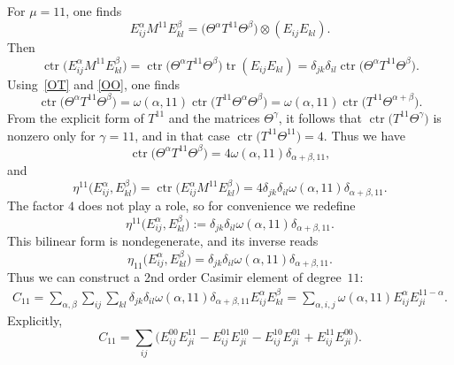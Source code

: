 \documentclass[pdftex]{sigma}
\numberwithin{equation}{section}
\theoremstyle{definition}
\begin{document}
For $\mu=11$, one finds
\begin{equation*}
	E_{ij}^\alpha M^{11} E_{kl}^\beta=
	\bigl(\Theta^\alpha T^{11} \Theta^\beta\bigr) \otimes (E_{ij}E_{kl}).
\end{equation*}
Then
\begin{equation*}
	\operatorname{ctr}\bigl(E_{ij}^\alpha M^{11} E_{kl}^\beta\bigr) = \operatorname{ctr}\bigl(\Theta^\alpha T^{11} \Theta^\beta\bigr) \operatorname{tr}(E_{ij}E_{kl} )
	= \delta_{jk}\delta_{il} \operatorname{ctr}\bigl(\Theta^\alpha T^{11} \Theta^\beta\bigr).
\end{equation*}
Using~\eqref{OT} and \eqref{OO}, one finds
\begin{equation*}
	\operatorname{ctr}\bigl(\Theta^\alpha T^{11} \Theta^\beta\bigr)= \omega(\alpha,11) \operatorname{ctr}\bigl(T^{11} \Theta^\alpha \Theta^\beta\bigr)=
	\omega(\alpha,11) \operatorname{ctr}\bigl(T^{11} \Theta^{\alpha+\beta}\bigr).
\end{equation*}
From the explicit form of $T^{11}$ and the matrices $\Theta^\gamma$, it follows that
$\operatorname{ctr}\bigl(T^{11} \Theta^{\gamma}\bigr)$ is nonzero only for $\gamma=11$, and in that case
$\operatorname{ctr}\bigl(T^{11} \Theta^{11}\bigr)=4$.
Thus we have
\begin{equation*}
	\operatorname{ctr}\bigl(\Theta^\alpha T^{11} \Theta^\beta\bigr)= 4\omega(\alpha,11)\delta_{\alpha+\beta,11},
\end{equation*}
and
\begin{equation*}
	\eta^{11}\bigl(E_{ij}^\alpha, E_{kl}^\beta\bigr)=\operatorname{ctr}\bigl(E_{ij}^\alpha M^{11} E_{kl}^\beta\bigr) = 4 \delta_{jk}\delta_{il}\omega(\alpha,11)\delta_{\alpha+\beta,11}.
\end{equation*}
The factor $4$ does not play a role, so for convenience we redefine
\begin{equation*}
	\eta^{11} \bigl(E_{ij}^\alpha, E_{kl}^\beta\bigr):= \delta_{jk}\delta_{il}\omega(\alpha,11)\delta_{\alpha+\beta,11}.
\end{equation*}
This bilinear form is nondegenerate, and its inverse reads
\begin{equation*}
	\eta_{11} \bigl(E_{ij}^\alpha, E_{kl}^\beta\bigr)= \delta_{jk}\delta_{il}\omega(\alpha,11)\delta_{\alpha+\beta,11}.
\end{equation*}
Thus we can construct a 2nd order Casimir element of degree~$11$:
\begin{align*}
	C_{11} = \sum_{\alpha,\beta}\sum_{ij}\sum_{kl}
	\delta_{jk}\delta_{il}\omega(\alpha,11)\delta_{\alpha+\beta,11} E_{ij}^\alpha E_{kl}^\beta
	 = \sum_{\alpha,i,j} \omega(\alpha,11) E_{ij}^\alpha E_{ji}^{11-\alpha}.
\end{align*}
Explicitly,
\begin{equation*}
	C_{11} = \sum_{ij} \bigl( E_{ij}^{00}E_{ji}^{11} - E_{ij}^{01}E_{ji}^{10} - E_{ij}^{10}E_{ji}^{01} + E_{ij}^{11}E_{ji}^{00} \bigr).
\end{equation*}
\end{document}
